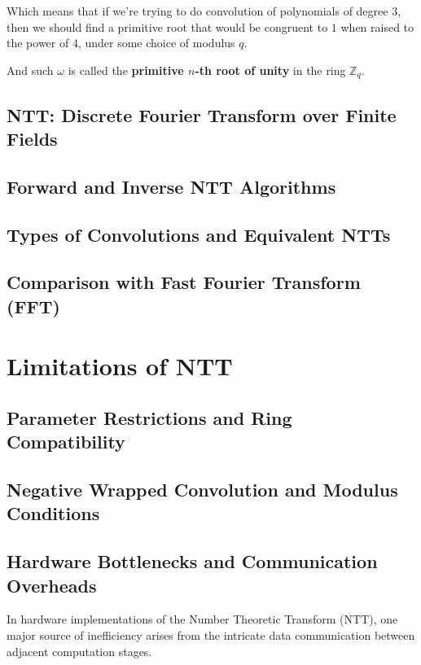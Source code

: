 \documentclass[12pt]{article}
\begin{document}
Which means that if we're trying to do convolution of polynomials of degree $3$, 
then we should find a primitive root that would be congruent to $1$ when raised to the power of $4$, 
under some choice of modulus $q$.

And such $\omega$ is called the \textbf{primitive $n$-th root of unity} in the ring $\mathbb{Z}_q$.
\cite[p.~4]{beginner_guide}

\subsection{NTT: Discrete Fourier Transform over Finite Fields}

\subsection{Forward and Inverse NTT Algorithms}

\subsection{Types of Convolutions and Equivalent NTTs}

\subsection{Comparison with Fast Fourier Transform (FFT)}

\section{Limitations of NTT}

\subsection{Parameter Restrictions and Ring Compatibility}

\subsection{Negative Wrapped Convolution and Modulus Conditions}

\subsection{Hardware Bottlenecks and Communication Overheads}

In hardware implementations of the Number Theoretic Transform (NTT), 
one major source of inefficiency arises from the intricate data communication between adjacent computation stages. 
\end{document}
